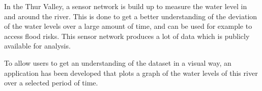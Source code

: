 In the Thur Valley, a sensor network is build up to measure the water level in and around the river. This is done to get a better understanding of the deviation of the water levels over a large amount of time, and can be used for example to access flood risks. This sensor network produces a lot of data which is publicly available for analysis. 

To allow users to get an understanding of the dataset in a visual way, an application has been developed that plots a graph of the water levels of this river over a selected period of time.